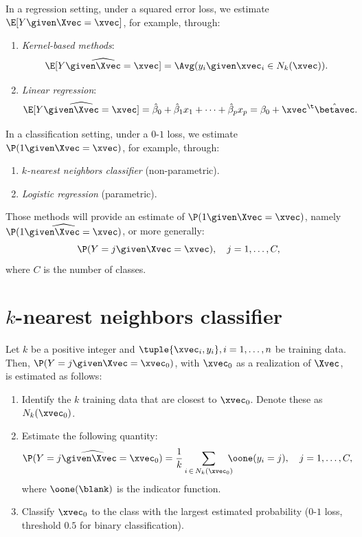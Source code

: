 
In a regression setting, under a squared error loss, we estimate $\E[Y \given \Xvec = \xvec]$, for example, through:
\begin{enumerate}
    \item \emph{Kernel-based methods}:
          \begin{equation}
              \widehat{\E[Y \given \Xvec = \xvec]} = \Avg(y_i \given \xvec_i \in N_k(\xvec)).
          \end{equation}
    \item \emph{Linear regression}:
          \begin{equation}
              \widehat{\E[Y \given \Xvec = \xvec]} = \hat{\beta}_0 + \hat{\beta}_1 x_1 + \cdots + \hat{\beta}_p x_p = \beta_0 + \xvec^\t \hat{\betavec}.
          \end{equation}
\end{enumerate}

In a classification setting, under a $0$-$1$ loss, we estimate $\P(1 \given \Xvec = \xvec)$, for example, through:
\begin{enumerate}
    \item \emph{$k$-nearest neighbors classifier} (non-parametric).
    \item \emph{Logistic regression} (parametric).
\end{enumerate}
Those methods will provide an estimate of $\P(1 \given \Xvec = \xvec)$, namely $\widehat{\P(1 \given \Xvec = \xvec)}$, or more generally:
\begin{equation}
    \P(Y = j \given \Xvec = \xvec), \quad j = 1, \ldots, C,
\end{equation}
where $C$ is the number of classes.

\section{\texorpdfstring{$k$-nearest neighbors classifier}{k-nearest neighbors classifier}}

Let $k$ be a positive integer and $\tuple{\xvec_i, y_i}, i = 1, \ldots, n$ be training data. Then, $\P(Y = j \given \Xvec = \xvec_0)$, with $\xvec_0$ as a realization of $\Xvec$, is estimated as follows:
\begin{enumerate}
    \item Identify the $k$ training data that are closest to $\xvec_0$. Denote these as $N_k(\xvec_0)$.
    \item Estimate the following quantity:
          \begin{equation}
              \widehat{\P(Y = j \given \Xvec = \xvec_0)} = \frac{1}{k} \sum_{i\,\in\,N_k(\xvec_0)}\hspace{-7pt}\oone(y_i = j), \quad j = 1, \ldots, C,
          \end{equation}
          where $\oone(\blank)$ is the indicator function.
    \item Classify $\xvec_0$ to the class with the largest estimated probability ($0$-$1$ loss, threshold $0.5$ for binary classification).
\end{enumerate}

